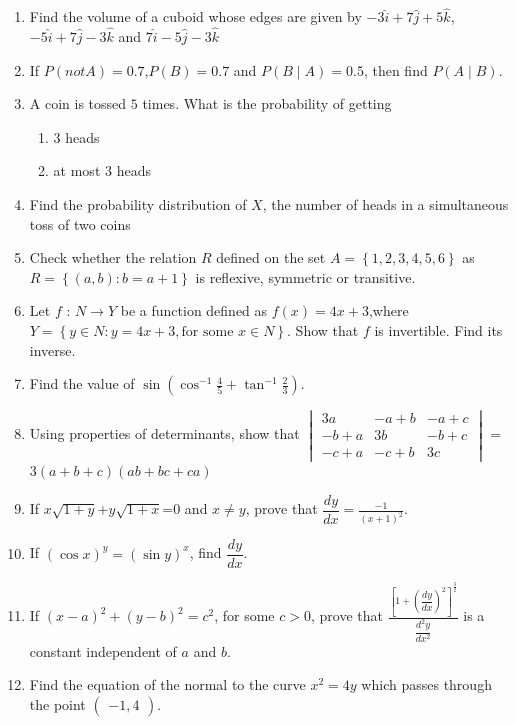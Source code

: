 \documentclass[12pt,-letter paper]{article}
\providecommand{\sbrak}[1]{\ensuremath{{}\left[#1\right]}}
\providecommand{\brak}[1]{\ensuremath{\left(#1\right)}}
\providecommand{\cbrak}[1]{\ensuremath{\left\{#1\right\}}}
\theoremstyle{remark}
\newcommand{\myvec}[1]{\ensuremath{\begin{pmatrix}#1\end{pmatrix}}}
\newcommand{\mydet}[1]{\ensuremath{\begin{vmatrix}#1\end{vmatrix}}}
\begin{document}
\begin{enumerate}
\item Find the volume of a cuboid whose edges are given by $-3\hat{i}+7\hat{j}+5\hat{k}$,$-5\hat{i}+7\hat{j}-3\hat{k}$ and $7\hat{i}-5\hat{j}-3\hat{k}$
\item If $P(not A) =0.7$,$P(B)=0.7$ and $P(B\mid A)=0.5$, then find $P(A\mid B)$.

\item A coin is tossed $5$ times. What is the probability of getting 
\begin{enumerate}[label=(\roman*)]
    \item $3$ heads
    \item at most $3$ heads
\end{enumerate}

\item Find the probability distribution of $X$, the number of heads in a simultaneous toss of two coins

\item Check whether the relation $R$ defined on the set $A=\cbrak{1,2,3,4,5,6}$ as $R =\cbrak {(a, b) : b = a + 1}$ is reflexive, symmetric or transitive.

\item Let $f$ : $N\rightarrow Y $ be a function defined as $f\brak{x}= 4x + 3$,where $Y=\cbrak{y\in N:y=4x+3, \text{for some } x\in N}$. Show that $f$ is invertible. Find its inverse.

\item Find the value of $\sin\brak{\cos^{-1}{\frac{4}{5}}+{\tan^{-1}{\frac{2}{3}}}}$.
\item Using properties of determinants, show that \mydet{3a & -a+b & -a+c \\ -b+a & 3b & -b+c \\ -c+a & -c+b & 3c} = 3\brak{a+b+c}\brak{ab+bc+ca}

\item If $x\sqrt{1+y}$+$y\sqrt{1+x}$=0 and $x\neq y$, prove that $\dfrac{dy}{dx} = \frac{-1}{\brak{x+1}^2}$.

\item If $\brak{\cos x}^y = \brak{\sin y }^x$, find $\dfrac{dy}{dx}$.

\item If $\brak{x-a}^2+\brak{y-b}^2={c}^2$, for some $c>0$, prove that
$\frac{\sbrak{1+\brak{\dfrac{dy}{dx}}^2}^\frac{3}{2}}{\dfrac{d^2y}{dx^2}}$ is a constant independent of $a$ and $b$.

\item Find the equation of the normal to the curve ${x}^2 = 4y$ which passes through the point $\myvec{-1,4}$.


\end{enumerate}
\end{document}
